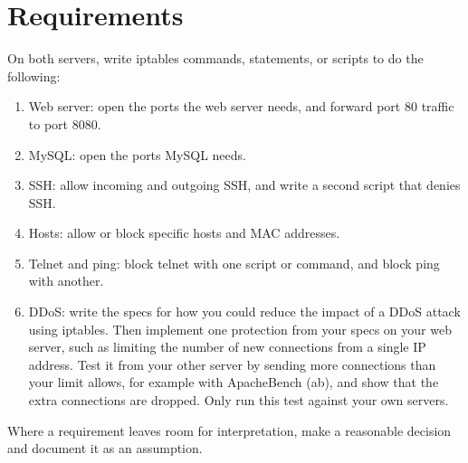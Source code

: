 \documentclass[12pt]{article}
\begin{document}
\section*{Requirements}
On both servers, write iptables commands, statements, or scripts to do the following:
\begin{enumerate}
    \item Web server: open the ports the web server needs, and forward port 80 traffic to port 8080.
    \item MySQL: open the ports MySQL needs.
    \item SSH: allow incoming and outgoing SSH, and write a second script that denies SSH.
    \item Hosts: allow or block specific hosts and MAC addresses.
    \item Telnet and ping: block telnet with one script or command, and block ping with another.
    \item DDoS: write the specs for how you could reduce the impact of a DDoS attack using iptables. Then implement one protection from your specs on your web server, such as limiting the number of new connections from a single IP address. Test it from your other server by sending more connections than your limit allows, for example with ApacheBench (ab), and show that the extra connections are dropped. Only run this test against your own servers.
\end{enumerate}
Where a requirement leaves room for interpretation, make a reasonable decision and document it as an assumption.
\end{document}

